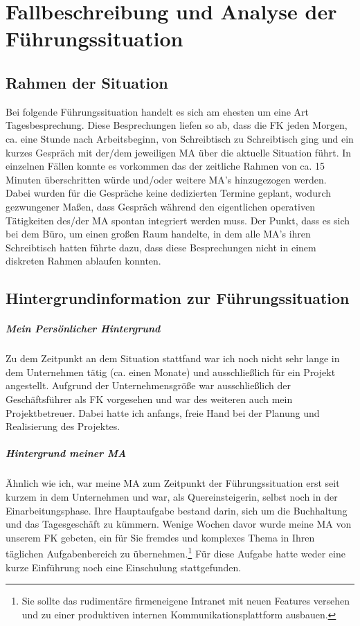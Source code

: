 \chapter{Fallbeschreibung und Analyse der Führungssituation}
\label{chap:hauptteil}

\section{Rahmen der Situation}
Bei folgende Führungssituation handelt es sich am ehesten um eine Art Tagesbesprechung.
Diese Besprechungen liefen so ab, dass die \ac{FK} jeden Morgen, ca. eine Stunde nach Arbeitsbeginn, von Schreibtisch zu Schreibtisch ging und ein kurzes Gespräch   mit der/dem jeweiligen \ac{MA} über die aktuelle Situation führt. 
In einzelnen Fällen konnte es vorkommen das der zeitliche Rahmen von ca. 15 Minuten überschritten würde und/oder weitere \ac{MA}'s hinzugezogen werden.
Dabei wurden für die Gespräche keine dedizierten Termine geplant, wodurch gezwungener Maßen, dass Gespräch während den eigentlichen operativen Tätigkeiten des/der \ac{MA} spontan integriert werden muss. 
Der Punkt, dass es sich bei dem Büro, um einen großen Raum handelte, in dem alle \ac{MA}'s ihren Schreibtisch hatten führte dazu, dass diese Besprechungen nicht in einem diskreten Rahmen ablaufen konnten.

\pagebreak

\section{Hintergrundinformation zur Führungssituation}

\paragraph*{Mein Persönlicher Hintergrund}
Zu dem Zeitpunkt an dem Situation stattfand war ich noch nicht sehr lange in dem Unternehmen tätig (ca. einen Monate) und ausschließlich für ein  Projekt angestellt. 
Aufgrund der Unternehmensgröße war ausschließlich der Geschäftsführer als \ac{FK} vorgesehen und war des weiteren auch mein Projektbetreuer. 
Dabei hatte ich anfangs, freie Hand bei der Planung und Realisierung des Projektes.

\paragraph*{Hintergrund meiner \ac{MA}}
\label{para:hintergrungMA}
Ähnlich wie ich, war meine \ac{MA} zum Zeitpunkt der Führungssituation erst seit kurzem in dem Unternehmen und war, als Quereinsteigerin, selbst noch in der  Einarbeitungsphase. 
Ihre Hauptaufgabe bestand darin, sich um die Buchhaltung und das Tagesgeschäft zu kümmern.
Wenige Wochen davor wurde meine \ac{MA} von unserem \ac{FK} gebeten, ein für Sie fremdes und komplexes Thema in Ihren täglichen Aufgabenbereich zu übernehmen.\footnote{Sie sollte das rudimentäre firmeneigene Intranet mit neuen Features versehen und zu einer produktiven internen Kommunikationsplattform ausbauen.} 
Für diese Aufgabe hatte weder eine kurze Einführung noch eine Einschulung stattgefunden.


